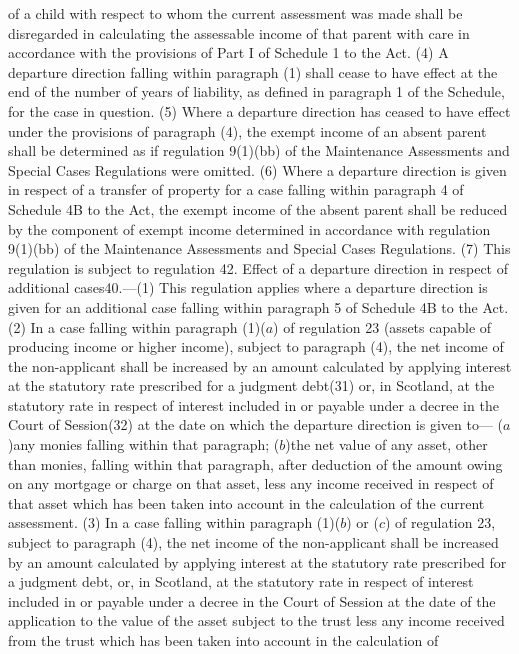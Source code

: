 \documentclass[a4paper]{article}
\begin{document}
of a child with respect to whom the current assessment was made shall be
disregarded in calculating the assessable income of that parent with care in
accordance with the provisions of Part I of Schedule 1 to the Act.
(4) A departure direction falling within paragraph (1) shall cease to have
effect at the end of the number of years of liability, as defined in paragraph 1
of the Schedule, for the case in question.
(5) Where a departure direction has ceased to have effect under the provisions
of paragraph (4), the exempt income of an absent parent shall be determined as
if regulation 9(1)(bb) of the Maintenance Assessments and Special Cases
Regulations were omitted.
(6) Where a departure direction is given in respect of a transfer of property
for a case falling within paragraph 4 of Schedule 4B to the Act, the exempt
income of the absent parent shall be reduced by the component of exempt income
determined in accordance with regulation 9(1)(bb) of the Maintenance Assessments
and Special Cases Regulations.
(7) This regulation is subject to regulation 42.
Effect of a departure direction in respect of additional cases40.—(1) This
regulation applies where a departure direction is given for an additional case
falling within paragraph 5 of Schedule 4B to the Act.
(2) In a case falling within paragraph (1)($a$) of regulation 23 (assets capable
of producing income or higher income), subject to paragraph (4), the net income
of the non-applicant shall be increased by an amount calculated by applying
interest at the statutory rate prescribed for a judgment debt(31) or, in
Scotland, at the statutory rate in respect of interest included in or payable
under a decree in the Court of Session(32) at the date on which the departure
direction is given to—
($a$)any monies falling within that paragraph;
($b$)the net value of any asset, other than monies, falling within that paragraph,
after deduction of the amount owing on any mortgage or charge on that asset,
less any income received in respect of that asset which has been taken into
account in the calculation of the current assessment.
(3) In a case falling within paragraph (1)($b$) or ($c$) of regulation 23, subject
to paragraph (4), the net income of the non-applicant shall be increased by an
amount calculated by applying interest at the statutory rate prescribed for a
judgment debt, or, in Scotland, at the statutory rate in respect of interest
included in or payable under a decree in the Court of Session at the date of the
application to the value of the asset subject to the trust less any income
received from the trust which has been taken into account in the calculation of
\end{document}
